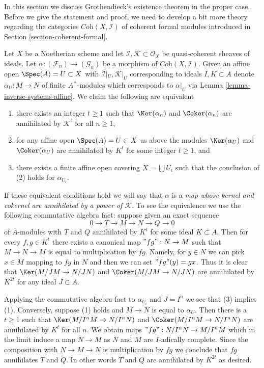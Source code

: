 \noindent
In this section we discuss Grothendieck's existence theorem in the proper case.
Before we give the statement and proof, we need to develop a bit
more theory regarding the categories $\textit{Coh}(X, \mathcal{I})$
of coherent formal modules
introduced in Section \ref{section-coherent-formal}.

\begin{remark}
\label{remark-inverse-systems-kernel-cokernel-annihilated-by}
Let $X$ be a Noetherian scheme and let
$\mathcal{I}, \mathcal{K} \subset \mathcal{O}_X$
be quasi-coherent sheaves of ideals. Let
$\alpha : (\mathcal{F}_n) \to (\mathcal{G}_n)$ be a morphism of
$\textit{Coh}(X, \mathcal{I})$.
Given an affine open $\Spec(A) = U \subset X$ with
$\mathcal{I}|_U, \mathcal{K}|_U$ corresponding to ideals $I, K \subset A$
denote $\alpha_U : M \to N$ of finite $A^\wedge$-modules which
corresponds to $\alpha|_U$ via Lemma \ref{lemma-inverse-systems-affine}.
We claim the following are equivalent
\begin{enumerate}
\item there exists an integer $t \geq 1$ such that
$\Ker(\alpha_n)$ and $\Coker(\alpha_n)$
are annihilated by $\mathcal{K}^t$ for all $n \geq 1$,
\item for any affine open $\Spec(A) = U \subset X$ as above
the modules $\Ker(\alpha_U)$ and $\Coker(\alpha_U)$
are annihilated by $K^t$ for some integer $t \geq 1$, and
\item there exists a finite affine open covering $X = \bigcup U_i$
such that the conclusion of (2) holds for $\alpha_{U_i}$.
\end{enumerate}
If these equivalent conditions hold we will say that
$\alpha$ is a
{\it map whose kernel and cokernel are annihilated by a power of
$\mathcal{K}$}.
To see the equivalence we use the following commutative algebra fact:
suppose given an exact sequence
$$
0 \to T \to M \to N \to Q \to 0
$$
of $A$-modules with $T$ and $Q$ annihilated by $K^t$ for some
ideal $K \subset A$. Then for every $f, g \in K^t$ there exists a
canonical map $"fg": N \to M$ such that $M \to N \to M$ is equal to
multiplication by $fg$. Namely, for $y \in N$ we can pick $x \in M$
mapping to $fy$ in $N$ and then we can set $"fg"(y) = gx$. Thus it is
clear that $\Ker(M/JM \to N/JN)$ and $\Coker(M/JM \to N/JN)$
are annihilated by $K^{2t}$ for any ideal $J \subset A$.

\medskip\noindent
Applying the commutative algebra fact to $\alpha_{U_i}$ and $J = I^n$
we see that (3) implies (1). Conversely,
suppose (1) holds and $M \to N$ is equal to $\alpha_U$. Then there is
a $t \geq 1$ such that
$\Ker(M/I^nM \to N/I^nN)$ and $\Coker(M/I^nM \to N/I^nN)$
are annihilated by $K^t$ for all $n$. We obtain maps
$"fg" : N/I^nN \to M/I^nM$ which in the limit induce a map $N \to M$
as $N$ and $M$ are $I$-adically complete. Since the composition with
$N \to M \to N$ is multiplication by $fg$ we conclude that $fg$
annihilates $T$ and $Q$. In other words $T$ and $Q$ are annihilated by
$K^{2t}$ as desired.
\end{remark}

